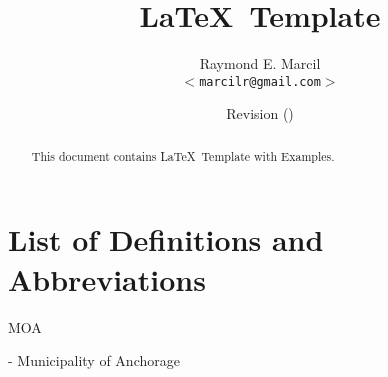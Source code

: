\documentclass[12pt,letterpaper,dvips]{article}
\title{\LaTeX\ Template}
\author{Raymond E. Marcil\\
        \texttt{$<$marcilr@gmail.com$>$}
}
\date{Revision \svnInfoRevision
      \hspace{2pt}
      (\svnInfoLongDate)}
\newenvironment{itemize*}%
  {\begin{itemize}%
    \setlength{\itemsep}{0pt}%
    \setlength{\parsep}{0pt}}%
  {\end{itemize}}
\begin{document}
\maketitle

\begin{abstract}
     This document contains \LaTeX\ Template with Examples.

\end{abstract}

\vspace{2.0in}


\newpage
\tableofcontents

\newpage
\listoffigures
\listoftables


\newpage
\setcounter{secnumdepth}{0}
\section{List of Definitions and Abbreviations}
\begin{itemize*}
  \item{\begin{bf}MOA\end{bf}} - Municipality of Anchorage

\end{itemize*}


\newpage
\end{document}

